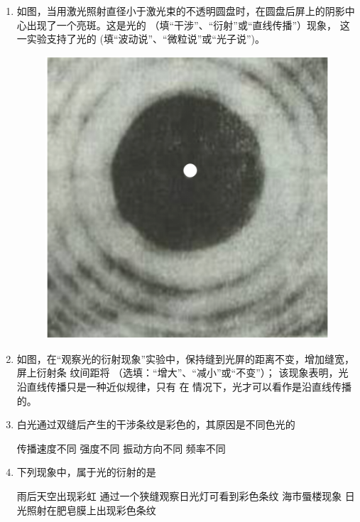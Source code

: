 

\begin{enumerate}
	\item
{}
如图，当用激光照射直径小于激光束的不透明圆盘时，在圆盘后屏上的阴影中
心出现了一个亮斑。这是光的
 \underlinegap 
（填“干涉”、“衍射”或“直线传播”）现象，
这一实验支持了光的
 \underlinegap 
(填“波动说”、“微粒说”或“光子说”)。
\begin{figure}[h!]
	\centering
	\includegraphics[width=0.17\linewidth]{picture/screenshot073}
\end{figure}





\item 
{}
如图，在“观察光的衍射现象”实验中，保持缝到光屏的距离不变，增加缝宽，屏上衍射条
纹间距将
 \underlinegap 
（选填：“增大”、“减小”或“不变”）；
该现象表明，光沿直线传播只是一种近似规律，只有
在
 \underlinegap 
情况下，光才可以看作是沿直线传播的。
\begin{figure}[h!]
	\centering
	
\end{figure}





\item 
{}
白光通过双缝后产生的干涉条纹是彩色的，其原因是不同色光的  

\fourchoices
{传播速度不同}
{强度不同}
{振动方向不同}
{频率不同}



\item 
{}
下列现象中，属于光的衍射的是  

\fourchoices
{雨后天空出现彩虹}
{通过一个狭缝观察日光灯可看到彩色条纹}
{海市蜃楼现象}
{日光照射在肥皂膜上出现彩色条纹}




\end{enumerate}
